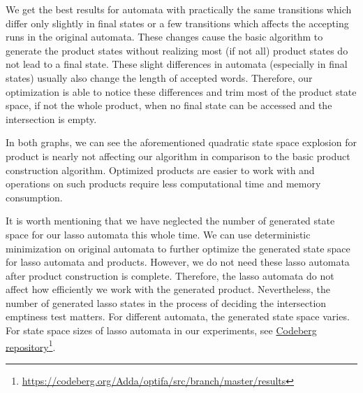 We get the best results for automata with practically the same transitions which differ only slightly in final states or a few transitions which affects the accepting runs in the original automata. These changes cause the basic algorithm to generate the product states without realizing most (if not all) product states do not lead to a final state. These slight differences in automata (especially in final states) usually also change the length of accepted words. Therefore, our optimization is able to notice these differences and trim most of the product state space, if not the whole product, when no final state can be accessed and the intersection is empty.

In both graphs, we can see the aforementioned quadratic state space explosion for product is nearly not affecting our algorithm in comparison to the basic product construction algorithm. Optimized products are easier to work with and operations on such products require less computational time and memory consumption.

It is worth mentioning that we have neglected the number of generated state space for our lasso automata this whole time. We can use deterministic minimization on original automata to further optimize the generated state space for lasso automata and products. However, we do not need these lasso automata after product construction is complete. Therefore, the lasso automata do not affect how efficiently we work with the generated product. Nevertheless, the number of generated lasso states in the process of deciding the intersection emptiness test matters. For different automata, the generated state space varies. For state space sizes of lasso automata in our experiments, see \href{https://codeberg.org/Adda/optifa/src/branch/master/results}{Codeberg repository}\footnote{\url{https://codeberg.org/Adda/optifa/src/branch/master/results}}.

